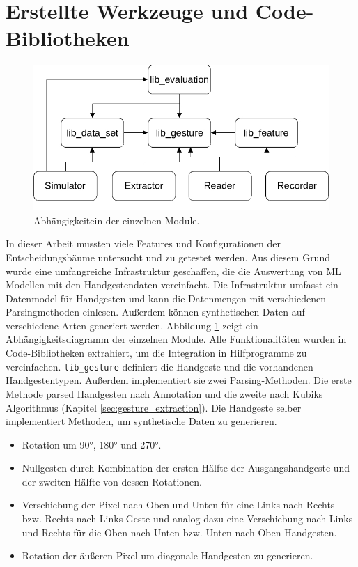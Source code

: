 \section{Erstellte Werkzeuge und Code-Bibliotheken}
\label{sec:recorder}
\begin{figure}
    \centering
    \includegraphics[width=0.75\linewidth]{images/architecture_overview.jpg}
    \caption{Abhängigkeitein der einzelnen Module.}
    \label{fig:architecture_overview}
\end{figure}
In dieser Arbeit mussten viele Features und Konfigurationen der Entscheidungsbäume untersucht und zu getestet werden. Aus diesem Grund wurde eine umfangreiche Infrastruktur geschaffen, die die
Auswertung von ML Modellen mit den Handgestendaten vereinfacht. Die Infrastruktur umfasst ein Datenmodel für Handgesten und kann die Datenmengen mit verschiedenen Parsingmethoden einlesen.
Außerdem können synthetischen Daten auf verschiedene Arten generiert werden. Abbildung \ref{fig:architecture_overview} zeigt ein Abhängigkeitsdiagramm der einzelnen Module.
Alle Funktionalitäten wurden in Code-Bibliotheken extrahiert, um die Integration in Hilfprogramme zu vereinfachen.
\newline
\newline
\texttt{lib\_gesture} definiert die Handgeste und die vorhandenen Handgestentypen. Außerdem implementiert sie zwei Parsing-Methoden. Die erste Methode parsed Handgesten nach Annotation und die
zweite nach Kubiks Algorithmus (Kapitel \ref{sec:gesture_extraction}). Die Handgeste selber implementiert Methoden, um synthetische Daten zu generieren.
\begin{itemize}
    \item Rotation um 90°, 180° und 270°.
    \item Nullgesten durch Kombination der ersten Hälfte der Ausgangshandgeste und der zweiten Hälfte von dessen Rotationen.
    \item Verschiebung der Pixel nach Oben und Unten für eine Links nach Rechts bzw. Rechts nach Links Geste und analog dazu eine Verschiebung nach Links und Rechts für die Oben nach Unten bzw. Unten nach Oben Handgesten.
    \item Rotation der äußeren Pixel um diagonale Handgesten zu generieren.
\end{itemize}
